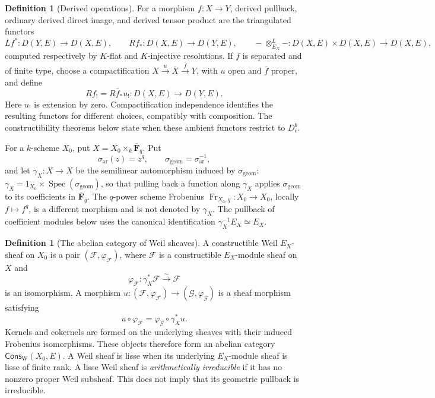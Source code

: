 \documentclass[10pt]{article}
\theoremstyle{definition}
\newtheorem{definition}[theorem]{Definition}
\newcommand{\Fbar}{\overline{\mathbf F}_q}
\begin{document}
\begin{definition}[Derived operations]
For a morphism \(f:X\to Y\), derived pullback, ordinary derived direct image,
and derived tensor product are the triangulated functors
\[
 Lf^*:D(Y,E)\to D(X,E),\qquad
 Rf_*:D(X,E)\to D(Y,E),\qquad
 -\otimes_{E_X}^L-:D(X,E)\times D(X,E)\to D(X,E),
\]
computed respectively by \(K\)-flat and \(K\)-injective resolutions.  If
\(f\) is separated and of finite type, choose a compactification
\(X\xrightarrow{u}\overline X\xrightarrow{\bar f}Y\), with \(u\) open and
\(\bar f\) proper, and define
\[
 Rf_!=R\bar f_*u_!:D(X,E)\longrightarrow D(Y,E).
\]
Here \(u_!\) is extension by zero.  Compactification independence identifies
the resulting functors for different choices, compatibly with composition.
The constructibility theorems below state when these ambient functors
restrict to \(D^b_c\).
\end{definition}

For a \(k\)-scheme \(X_0\), put
\(X=X_0\times_k\Fbar\).  Put
\[
 \sigma_{\mathrm{ar}}(z)=z^q,\qquad
 \sigma_{\mathrm{geom}}=\sigma_{\mathrm{ar}}^{-1},
\]
and let \(\gamma_X:X\to X\) be the semilinear automorphism induced by
\(\sigma_{\mathrm{geom}}\): \(\gamma_X=1_{X_0}\times\operatorname{Spec}(\sigma_{\mathrm{geom}})\),
so that pulling back a function along \(\gamma_X\) applies \(\sigma_{\mathrm{geom}}\) to its
coefficients in \(\Fbar\).  The \(q\)-power scheme Frobenius
\(\operatorname{Fr}_{X_0,q}:X_0\to X_0\), locally \(f\mapsto f^q\), is a
different morphism and is not denoted by \(\gamma_X\).
The pullback of coefficient modules below uses the canonical identification
\(\gamma_X^{-1}E_X\simeq E_X\).

\begin{definition}[The abelian category of Weil sheaves]
A constructible Weil \(E_X\)-sheaf on \(X_0\) is a pair
\((\mathcal F,\varphi_{\mathcal F})\), where \(\mathcal F\) is a
constructible \(E_X\)-module sheaf on \(X\) and
\[
  \varphi_{\mathcal F}:\gamma_X^*\mathcal F\xrightarrow{\sim}\mathcal F
\]
is an isomorphism.  A morphism \(u:(\mathcal F,\varphi_{\mathcal F})\to
(\mathcal G,\varphi_{\mathcal G})\) is a sheaf morphism satisfying
\[
 u\circ\varphi_{\mathcal F}
   =\varphi_{\mathcal G}\circ\gamma_X^*u.
\]
Kernels and cokernels are formed on the underlying sheaves with their
induced Frobenius isomorphisms.  These objects therefore form an abelian
category \(\mathsf{Cons}_{\mathrm W}(X_0,E)\).  A Weil sheaf is lisse when
its underlying \(E_X\)-module sheaf is lisse of finite rank.
A lisse Weil sheaf is \emph{arithmetically irreducible} if it has no nonzero
proper Weil subsheaf.  This does not imply that its geometric pullback is
irreducible.
\end{definition}
\end{document}
